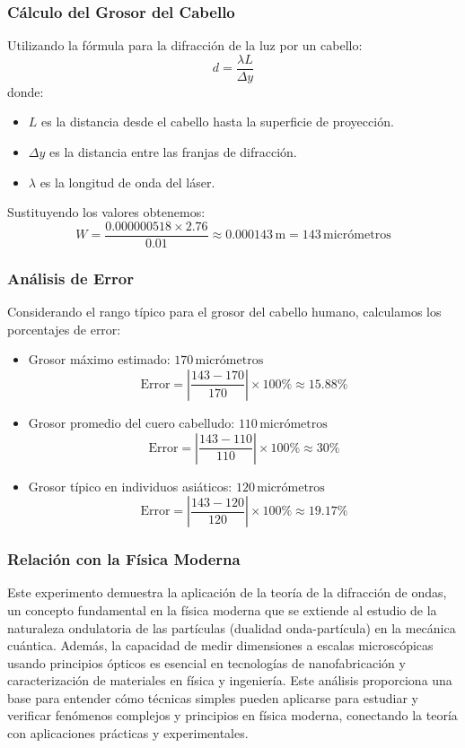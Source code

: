\subsubsection{Cálculo del Grosor del Cabello}
Utilizando la fórmula para la difracción de la luz por un cabello:
\[
d = \frac{\lambda L}{\Delta y}
\]
donde:
\begin{itemize}
    \item \(L\) es la distancia desde el cabello hasta la superficie de proyección.
    \item \(\Delta y\) es la distancia entre las franjas de difracción.
    \item \(\lambda\) es la longitud de onda del láser.
\end{itemize}
Sustituyendo los valores obtenemos:
\[
W = \frac{0.000000518 \times 2.76}{0.01} \approx 0.000143 \, \text{m} = 143 \, \text{micrómetros}
\]

\subsubsection{Análisis de Error}
Considerando el rango típico para el grosor del cabello humano, calculamos los porcentajes de error:
\begin{itemize}
    \item Grosor máximo estimado: \(170 \, \text{micrómetros}\)
    \[
    \text{Error} = \left| \frac{143 - 170}{170} \right| \times 100\% \approx 15.88\%
    \]
    \item Grosor promedio del cuero cabelludo: \(110 \, \text{micrómetros}\)
    \[
    \text{Error} = \left| \frac{143 - 110}{110} \right| \times 100\% \approx 30\%
    \]
    \item Grosor típico en individuos asiáticos: \(120 \, \text{micrómetros}\)
    \[
    \text{Error} = \left| \frac{143 - 120}{120} \right| \times 100\% \approx 19.17\%
    \]
\end{itemize}

\subsubsection{Relación con la Física Moderna}
Este experimento demuestra la aplicación de la teoría de la difracción de ondas, un concepto fundamental en la física moderna que se extiende al estudio de la naturaleza ondulatoria de las partículas (dualidad onda-partícula) en la mecánica cuántica. Además, la capacidad de medir dimensiones a escalas microscópicas usando principios ópticos es esencial en tecnologías de nanofabricación y caracterización de materiales en física y ingeniería. Este análisis proporciona una base para entender cómo técnicas simples pueden aplicarse para estudiar y verificar fenómenos complejos y principios en física moderna, conectando la teoría con aplicaciones prácticas y experimentales.


